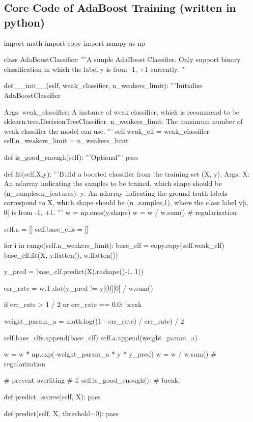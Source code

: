 \documentclass[journal, a4paper]{IEEEtran}
\begin{document}
\subsection{Core Code of AdaBoost Training (written in python)}

\begin{python} 
import math
import copy
import numpy as np

class AdaBoostClassifier:
    '''A simple AdaBoost Classifier.
    Only support binary classification in which 
    the label y is from {-1, +1} currently.
    '''

    def __init__(self, weak_classifier, n_weakers_limit):
        '''Initialize AdaBoostClassifier

        Args:
            weak_classifier: A instance of weak classifier, 
            which is recommend to be 
            sklearn.tree.DecisionTreeClassifier.
            n_weakers_limit: The maximum number of weak classifier 
            the model can use.
        '''
        self.weak_clf = weak_classifier
        self.n_weakers_limit = n_weakers_limit

    def is_good_enough(self):
        '''Optional'''
        pass

    def fit(self,X,y):
        '''Build a boosted classifier from the training set (X, y).
        Args:
            X: An ndarray indicating the samples to be trained, 
            which shape should be (n_samples,n_features).
            y: An ndarray indicating the ground-truth labels 
            correspond to X, which shape should be (n_samples,1),
               where the class label y[i, 0] is from {-1, +1}.
        '''
        w = np.ones(y.shape)
        w = w / w.sum() # regularization

        self.a = []
        self.base_clfs = []

        for i in range(self.n_weakers_limit):
            base_clf = copy.copy(self.weak_clf)
            base_clf.fit(X, y.flatten(), w.flatten())

            y_pred = base_clf.predict(X).reshape((-1, 1))

            err_rate = w.T.dot(y_pred != y)[0][0] / w.sum()

            if err_rate > 1 / 2 or err_rate == 0.0:
                break

            weight_param_a = math.log((1 - err_rate) / err_rate) / 2

            self.base_clfs.append(base_clf)
            self.a.append(weight_param_a)

            w = w * np.exp(-weight_param_a * y * y_pred)
            w = w / w.sum() # regularization

            # prevent overfiting
            # if self.is_good_enough():
            #     break;

    def predict_scores(self, X):
        pass

    def predict(self, X, threshold=0):
        pass

\end{python}

\end{document}
